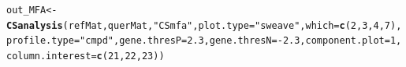 \documentclass[a4paper]{article}\usepackage[]{graphicx}\usepackage[]{color}
\makeatletter
\newcommand{\hlnum}[1]{\textcolor[rgb]{0.686,0.059,0.569}{#1}}%
\newcommand{\hlstr}[1]{\textcolor[rgb]{0.192,0.494,0.8}{#1}}%
\newcommand{\hlopt}[1]{\textcolor[rgb]{0,0,0}{#1}}%
\newcommand{\hlstd}[1]{\textcolor[rgb]{0.345,0.345,0.345}{#1}}%
\newcommand{\hlkwb}[1]{\textcolor[rgb]{0.69,0.353,0.396}{#1}}%
\newcommand{\hlkwc}[1]{\textcolor[rgb]{0.333,0.667,0.333}{#1}}%
\newcommand{\hlkwd}[1]{\textcolor[rgb]{0.737,0.353,0.396}{\textbf{#1}}}%
\newenvironment{kframe}{%
 \def\at@end@of@kframe{}%
 \ifinner\ifhmode%
  \def\at@end@of@kframe{\end{minipage}}%
  \begin{minipage}{\columnwidth}%
 \fi\fi%
 \def\FrameCommand##1{\hskip\@totalleftmargin \hskip-\fboxsep
 \colorbox{shadecolor}{##1}\hskip-\fboxsep
     \hskip-\linewidth \hskip-\@totalleftmargin \hskip\columnwidth}%
 \MakeFramed {\advance\hsize-\width
   \@totalleftmargin\z@ \linewidth\hsize
   \@setminipage}}%
 {\par\unskip\endMakeFramed%
 \at@end@of@kframe}
\newenvironment{knitrout}{}{} %
\makeatother
\begin{document}
\begin{knitrout}
\color{fgcolor}\begin{kframe}
\begin{alltt}
\hlstd{out_MFA} \hlkwb{<-} \hlkwd{CSanalysis}\hlstd{(refMat,querMat,}\hlstr{"CSmfa"}\hlstd{,}\hlkwc{plot.type}\hlstd{=}\hlstr{"sweave"}\hlstd{,}\hlkwc{which}\hlstd{=}\hlkwd{c}\hlstd{(}\hlnum{2}\hlstd{,}\hlnum{3}\hlstd{,}\hlnum{4}\hlstd{,}\hlnum{7}\hlstd{),}
                \hlkwc{profile.type}\hlstd{=}\hlstr{"cmpd"}\hlstd{,}\hlkwc{gene.thresP}\hlstd{=}\hlnum{2.3}\hlstd{,}\hlkwc{gene.thresN}\hlstd{=}\hlopt{-}\hlnum{2.3}\hlstd{,}\hlkwc{component.plot}\hlstd{=}\hlnum{1}\hlstd{,}
                \hlkwc{column.interest}\hlstd{=}\hlkwd{c}\hlstd{(}\hlnum{21}\hlstd{,}\hlnum{22}\hlstd{,}\hlnum{23}\hlstd{))}
\end{alltt}
\end{kframe}\begin{figure}[H]


\end{figure}
\end{knitrout}
\end{document}
